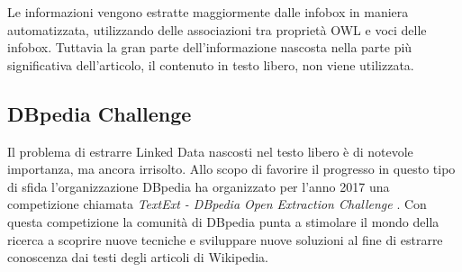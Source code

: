 Le informazioni vengono estratte maggiormente dalle infobox in maniera automatizzata, utilizzando delle associazioni tra proprietà OWL e voci delle infobox. Tuttavia la gran parte dell'informazione nascosta nella parte più significativa dell'articolo, il contenuto in testo libero, non viene utilizzata.

\subsection{DBpedia Challenge}
\label{sec:intro:dbpedia:challenge}

Il problema di estrarre Linked Data nascosti nel testo libero è di notevole importanza, ma ancora irrisolto. Allo scopo di favorire il progresso in questo tipo di sfida l'organizzazione DBpedia ha organizzato per l'anno 2017 una competizione chiamata \textit{TextExt - DBpedia Open Extraction Challenge} \cite{DBpedia_TextExt}. Con questa competizione la comunità di DBpedia punta a stimolare il mondo della ricerca a scoprire nuove tecniche e sviluppare nuove soluzioni al fine di estrarre conoscenza dai testi degli articoli di Wikipedia.

